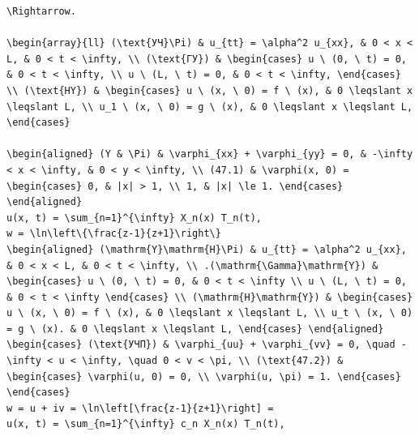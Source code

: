 \documentclass[
  ukrainian,
]{article}
\begin{document}
\begin{verbatim}
\Rightarrow.

\begin{array}{ll} (\text{УЧ}\Pi) & u_{tt} = \alpha^2 u_{xx}, & 0 < x < L, & 0 < t < \infty, \\ (\text{ГУ}) & \begin{cases} u \ (0, \ t) = 0, & 0 < t < \infty, \\ u \ (L, \ t) = 0, & 0 < t < \infty, \end{cases} \\ (\text{HY}) & \begin{cases} u \ (x, \ 0) = f \ (x), & 0 \leqslant x \leqslant L, \\ u_1 \ (x, \ 0) = g \ (x), & 0 \leqslant x \leqslant L, \end{cases}

\begin{aligned} (Y & \Pi) & \varphi_{xx} + \varphi_{yy} = 0, & -\infty < x < \infty, & 0 < y < \infty, \\ (47.1) & \varphi(x, 0) = \begin{cases} 0, & |x| > 1, \\ 1, & |x| \le 1. \end{cases} \end{aligned}
u(x, t) = \sum_{n=1}^{\infty} X_n(x) T_n(t),
w = \ln\left\{\frac{z-1}{z+1}\right\}
\begin{aligned} (\mathrm{Y}\mathrm{H}\Pi) & u_{tt} = \alpha^2 u_{xx}, & 0 < x < L, & 0 < t < \infty, \\ .(\mathrm{\Gamma}\mathrm{Y}) & \begin{cases} u \ (0, \ t) = 0, & 0 < t < \infty \\ u \ (L, \ t) = 0, & 0 < t < \infty \end{cases} \\ (\mathrm{H}\mathrm{Y}) & \begin{cases} u \ (x, \ 0) = f \ (x), & 0 \leqslant x \leqslant L, \\ u_t \ (x, \ 0) = g \ (x). & 0 \leqslant x \leqslant L, \end{cases} \end{aligned}
\begin{cases} (\text{УЧП}) & \varphi_{uu} + \varphi_{vv} = 0, \quad -\infty < u < \infty, \quad 0 < v < \pi, \\ (\text{47.2}) & \begin{cases} \varphi(u, 0) = 0, \\ \varphi(u, \pi) = 1. \end{cases} \end{cases}
w = u + iv = \ln\left[\frac{z-1}{z+1}\right] =
u(x, t) = \sum_{n=1}^{\infty} c_n X_n(x) T_n(t),
\end{verbatim}
\end{document}
